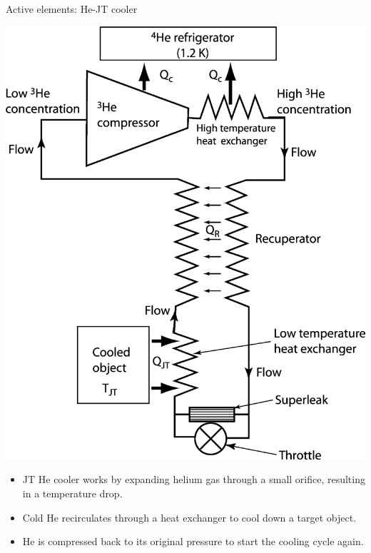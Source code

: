 \documentclass{cubeamer}
\begin{document}
\begin{frame}{Active elements: He-JT cooler}
\begin{minipage}{0.4\textwidth}
    \includegraphics[width=0.9\linewidth]{Figures/JTHE.png} 
\end{minipage}
\begin{minipage}{0.5\textwidth}
\begin{itemize}
    \item JT He cooler works by expanding helium gas through a small orifice, resulting in a temperature drop. 
    \item Cold He recirculates through a heat exchanger to cool down a target object.
    \item He is compressed back to its original pressure to start the cooling cycle again.
\end{itemize}
\end{minipage}
\end{frame}
\end{document}
